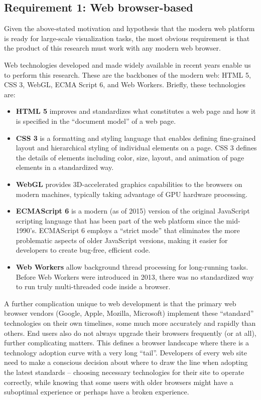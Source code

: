 \hypertarget{requirement-1-web-browser-based}{%
\subsection{Requirement 1: Web browser-based}\label{requirement-1-web-browser-based}}

Given the above-stated motivation and hypothesis that the modern web platform is ready for large-scale visualization tasks, the most obvious requirement is that the product of this research must work with any modern web browser.

Web technologies developed and made widely available in recent years enable us to perform this research. These are the backbones of the modern web: HTML 5, CSS 3, WebGL, ECMA Script 6, and Web Workers. Briefly, these technologies are:

\begin{itemize}
\tightlist
\item
  \textbf{HTML 5} improves and standardizes what constitutes a web page and how it is specified in the ``document model'' of a web page.
\item
  \textbf{CSS 3} is a formatting and styling language that enables defining fine-grained layout and hierarchical styling of individual elements on a page. CSS 3 defines the details of elements including color, size, layout, and animation of page elements in a standardized way.
\item
  \textbf{WebGL} provides 3D-accelerated graphics capabilities to the browsers on modern machines, typically taking advantage of \gls{GPU} hardware processing.
\item
  \textbf{ECMAScript 6} is a modern (as of 2015) version of the original
  JavaScript scripting language that has been part of the web platform
  since the mid-1990's. ECMAScript 6 employs a ``strict mode'' that eliminates the
  more problematic aspects of older JavaScript versions, making it easier for
  developers to create bug-free, efficient code.
\item
  \textbf{Web Workers} allow background thread processing for long-running tasks. Before
  Web Workers were introduced in 2013, there was no standardized way to run truly multi-threaded code inside a browser.
\end{itemize}

A further complication unique to web development is that the primary web browser vendors (Google, Apple, Mozilla, Microsoft) implement these ``standard'' technologies on their own timelines, some much more accurately and rapidly than others. End users also do not always upgrade their browsers frequently (or at all), further complicating matters. This defines a browser landscape where there is a technology adoption curve with a very long ``tail''. Developers of every web site need to make a conscious decision about where to draw the line when adopting the latest standards -- choosing necessary technologies for their site to operate correctly, while knowing that some users with older browsers might have a suboptimal experience or perhaps have a broken experience.

